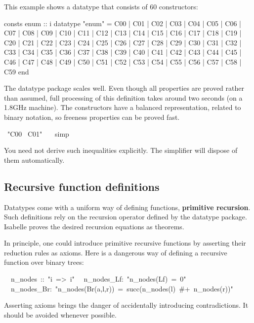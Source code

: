 This example shows a datatype that consists of 60 constructors:
\begin{alltt*}\isastyleminor
consts  enum :: i
datatype
  "enum" = C00 | C01 | C02 | C03 | C04 | C05 | C06 | C07 | C08 | C09
         | C10 | C11 | C12 | C13 | C14 | C15 | C16 | C17 | C18 | C19
         | C20 | C21 | C22 | C23 | C24 | C25 | C26 | C27 | C28 | C29
         | C30 | C31 | C32 | C33 | C34 | C35 | C36 | C37 | C38 | C39
         | C40 | C41 | C42 | C43 | C44 | C45 | C46 | C47 | C48 | C49
         | C50 | C51 | C52 | C53 | C54 | C55 | C56 | C57 | C58 | C59
end
\end{alltt*}
The datatype package scales well.  Even though all properties are proved
rather than assumed, full processing of this definition takes around two seconds
(on a 1.8GHz machine).  The constructors have a balanced representation,
related to binary notation, so freeness properties can be proved fast.
\begin{isabelle}
\ "C00 \isasymnoteq\ C01"\isanewline
\ \ \ simp
\end{isabelle}
You need not derive such inequalities explicitly.  The simplifier will
dispose of them automatically.



\subsection{Recursive function definitions}\label{sec:ZF:recursive}

Datatypes come with a uniform way of defining functions, {\bf primitive
  recursion}.  Such definitions rely on the recursion operator defined by the
datatype package.  Isabelle proves the desired recursion equations as
theorems.

In principle, one could introduce primitive recursive functions by asserting
their reduction rules as axioms.  Here is a dangerous way of defining a
recursive function over binary trees:
\begin{isabelle}
\ \ n\_nodes\ ::\ "i\ =>\ i"\isanewline
{}\isanewline
\ \ n\_nodes\_Lf:\ "n\_nodes(Lf)\ =\ 0"\isanewline
\ \ n\_nodes\_Br:\ "n\_nodes(Br(a,l,r))\ =\ succ(n\_nodes(l)\ \#+\ n\_nodes(r))"
\end{isabelle}
Asserting axioms brings the danger of accidentally introducing
contradictions.  It should be avoided whenever possible.

